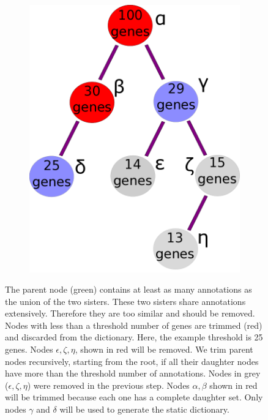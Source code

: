 \documentclass{bmcart}
\begin{document}
\begin{backmatter}
\begin{figure}[h!]
\begin{subfigure}[b]{0.3\textwidth}
	      \caption{}
    \label{fig:trim_ends}
  \end{subfigure}
  \begin{subfigure}[b]{0.3\textwidth}
    \includegraphics[width=\textwidth]{figures/CeilingTrimmingOntogeny.png}
    	\caption{}
    \label{fig:trim_roots}
  \end{subfigure}

  \captionsetup{width= 0.95\textwidth}
  \caption{
     The parent node (green) contains at least as many annotations as the union of the two sisters. These two sisters share annotations extensively. Therefore they are too similar and should be removed.
	 Nodes with less than a threshold number of genes are trimmed (red) and discarded from the dictionary. Here, the example threshold is 25 genes. Nodes $\epsilon, \zeta, \eta$, shown in red will be removed.
	 We trim parent nodes recursively, starting from the root, if all their daughter nodes have more than the threshold number of annotations. Nodes in grey ($\epsilon, \zeta, \eta$) were removed in the previous step. Nodes $\alpha, \beta$ shown in red will be trimmed because each one has a complete daughter set. Only nodes $\gamma$ and $\delta$ will be used to generate the static dictionary. 
  }
\end{figure}


\end{backmatter}
\end{document}
